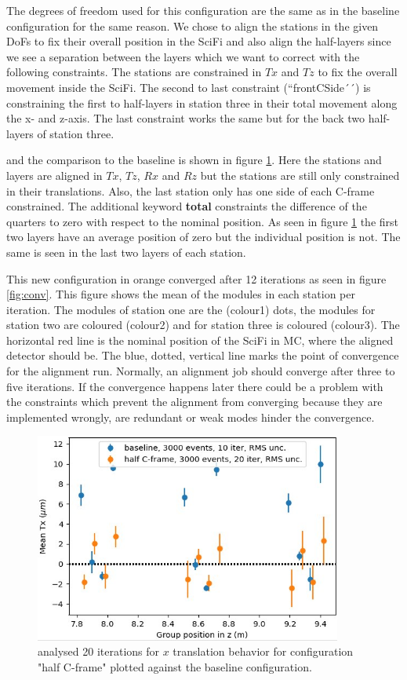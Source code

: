 The degrees of freedom used for this configuration are the same as in the baseline configuration for the same reason.
We chose to align the stations in the given DoFs to fix their overall position in the SciFi and also align the half-layers since we see a separation between the layers which we want to correct with the following constraints.
The stations are constrained in $Tx$ and $Tz$ to fix the overall movement inside the SciFi. The second to last constraint (``frontCSide´´) is constraining the first to half-layers in station three in their total movement along the x- and z-axis.
The last constraint works the same but for the back two half-layers of station three.

and the comparison to the baseline is shown in figure \ref{fig:june_3}.
Here the stations and layers are aligned in $Tx$, $Tz$, $Rx$ and $Rz$ but the stations are still only constrained in their translations. Also, the last station only has one side of each C-frame constrained. The additional keyword \textbf{total} constraints
the difference of the quarters to zero with respect to the nominal position. As seen in figure \ref{fig:june_3} the first two layers have an average position of zero but the individual position is not. The same is seen in the last two layers of each station.

This new configuration in orange converged after 12 iterations as seen in figure \ref{fig:conv}.
This figure shows the mean of the modules in each station per iteration. The modules of station one are the (colour1) dots, the modules for station two are coloured (colour2) and for station three is coloured (colour3).
The horizontal red line is the nominal position of the SciFi in MC, where the aligned detector should be.
The blue, dotted, vertical line marks the point of convergence for the alignment run.
Normally, an alignment job should converge after three to five iterations. If the convergence happens later there could be a problem with the constraints which prevent the alignment from converging because they are implemented wrongly, are redundant or weak modes hinder the convergence.

\begin{figure}
  \centering
  \includegraphics[width=0.9\textwidth]{plots/renewed_plots/lxplus/4_5.jpeg}
  \caption{analysed 20 iterations for $x$ translation behavior for configuration "half C-frame" plotted against the baseline configuration.}
  \label{fig:june_3}
\end{figure}

